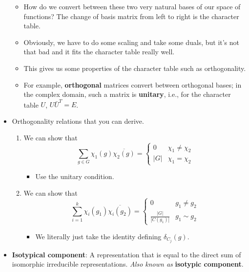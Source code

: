 \documentclass[../notes.tex]{subfiles}
\begin{document}
\begin{itemize}
\begin{itemize}
        \item How do we convert between these two very natural bases of our space of functions? The change of basis matrix from left to right is the character table.
        \item Obviously, we have to do some scaling and take some duals, but it's not that bad and it fits the character table really well.
        \item This gives us some properties of the character table such as orthogonality.
        \item For example, \textbf{orthogonal} matrices convert between orthogonal bases; in the complex domain, such a matrix is \textbf{unitary}, i.e., for the character table $U$, $U\bar{U}^T=E$.
    \end{itemize}
    \item Orthogonality relations that you can derive.
    \begin{enumerate}
        \item We can show that
        \begin{equation*}
            \sum_{g\in G}\chi_1(g)\overline{\chi_2(g)} =
            \begin{cases}
                0 & \chi_1\neq\chi_2\\
                |G| & \chi_1=\chi_2
            \end{cases}
        \end{equation*}
        \begin{itemize}
            \item Use the unitary condition.
        \end{itemize}
        \item We can show that
        \begin{equation*}
            \sum_{i=1}^k\chi_i(g_1)\overline{\chi_i(g_2)} =
            \begin{cases}
                0 & g_1\neq g_2\\
                \frac{|G|}{|C(g_1)|} & g_1\sim g_2
            \end{cases}
        \end{equation*}
        \begin{itemize}
            \item We literally just take the identity defining $\delta_{C_j}(g)$.
        \end{itemize}
    \end{enumerate}
    \item \textbf{Isotypical component}: A representation that is equal to the direct sum of isomorphic irreducible representations. \emph{Also known as} \textbf{isotypic component}.

\end{itemize}
\end{document}

